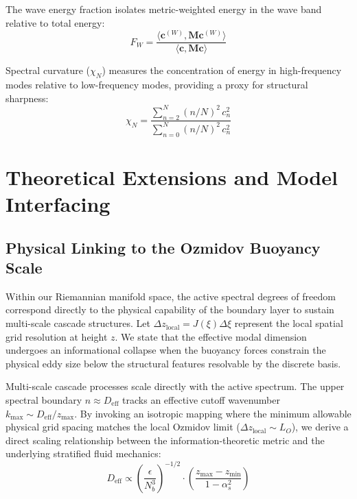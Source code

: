 The wave energy fraction isolates metric-weighted energy in the wave band relative to total energy:
\begin{equation}
F_W = \frac{\langle \mathbf{c}^{(W)}, \mathbf{M} \mathbf{c}^{(W)} \rangle}{\langle \mathbf{c}, \mathbf{M} \mathbf{c} \rangle}
\label{eq:f_w}
\end{equation}

Spectral curvature ($\chi_N$) measures the concentration of energy in high-frequency modes relative to low-frequency modes, providing a proxy for structural sharpness:
\begin{equation}
\chi_N = \frac{\sum_{n=2}^{N} (n/N)^2 \, c_n^2}{\sum_{n=0}^{N} (n/N)^2 \, c_n^2}
\label{eq:chi_n}
\end{equation}

\section{Theoretical Extensions and Model Interfacing}
\label{sec:extensions}

\subsection{Physical Linking to the Ozmidov Buoyancy Scale}
\label{sec:extensions:ozmidov}

Within our Riemannian manifold space, the active spectral degrees of freedom correspond directly to the physical capability of the boundary layer to sustain multi-scale cascade structures. Let $\Delta z_{\text{local}} = J(\xi) \Delta \xi$ represent the local spatial grid resolution at height $z$. We state that the effective modal dimension undergoes an informational collapse when the buoyancy forces constrain the physical eddy size below the structural features resolvable by the discrete basis.

Multi-scale cascade processes scale directly with the active spectrum. The upper spectral boundary $n \approx D_{\mathrm{eff}}$ tracks an effective cutoff wavenumber $k_{\mathrm{max}} \sim D_{\mathrm{eff}} / z_{\max}$. By invoking an isotropic mapping where the minimum allowable physical grid spacing matches the local Ozmidov limit ($\Delta z_{\text{local}} \sim L_O$), we derive a direct scaling relationship between the information-theoretic metric and the underlying stratified fluid mechanics:
\begin{equation}
D_{\mathrm{eff}} \propto \left( \frac{\epsilon}{N_b^3} \right)^{-1/2} \cdot \left( \frac{z_{\max} - z_{\min}}{1 - \alpha_s^2} \right)
\label{eq:d_eff_ozmidov_scaling}
\end{equation}

